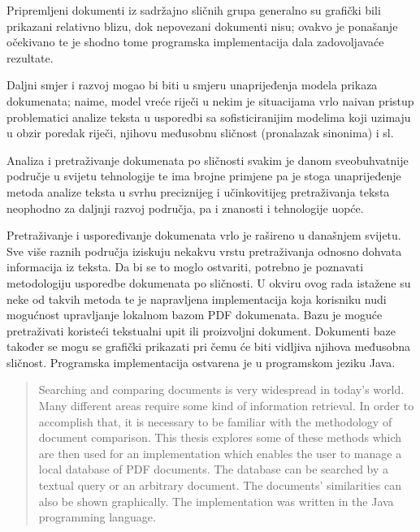 \documentclass[times, utf8, zavrsni, numeric]{fer}
\begin{document}
Pripremljeni dokumenti iz sadržajno sličnih grupa generalno su grafički bili prikazani relativno blizu, dok nepovezani dokumenti nisu; ovakvo je ponašanje očekivano te je shodno tome programska implementacija dala zadovoljavaće rezultate.

Daljni smjer i razvoj mogao bi biti u smjeru unaprijeđenja modela prikaza dokumenata; naime, model vreće riječi u nekim je situacijama vrlo naivan pristup problematici analize teksta u usporedbi sa sofisticiranijim modelima koji uzimaju u obzir poredak riječi, njihovu međusobnu sličnost (pronalazak sinonima) i sl.

Analiza i pretraživanje dokumenata po sličnosti svakim je danom sveobuhvatnije područje u svijetu tehnologije te ima brojne primjene pa je stoga unaprijeđenje metoda analize teksta u svrhu preciznijeg i učinkovitijeg pretraživanja teksta neophodno za daljnji razvoj područja, pa i znanosti i tehnologije uopće.




\begin{sazetak}
Pretraživanje i uspoređivanje dokumenata vrlo je rašireno u današnjem svijetu. Sve više raznih područja iziskuju nekakvu vrstu pretraživanja odnosno dohvata informacija iz teksta. Da bi se to moglo ostvariti, potrebno je poznavati metodologiju usporedbe dokumenata po sličnosti. U okviru ovog rada istažene su neke od takvih metoda te je napravljena implementacija koja korisniku nudi mogućnost upravljanje lokalnom bazom PDF dokumenata. Bazu je moguće pretraživati koristeći tekstualni upit ili proizvoljni dokument. Dokumenti baze također se mogu se grafički prikazati pri čemu će biti vidljiva njihova međusobna sličnost. Programska implementacija ostvarena je u programskom jeziku Java.

\end{sazetak}

\begin{abstract}
Searching and comparing documents is very widespread in today's world. Many different areas require some kind of information retrieval. In order to accomplish that, it is necessary to be familiar with the methodology of document comparison. This thesis explores some of these methods which are then used for an implementation which enables the user to manage a local database of PDF documents. The database can be searched by a textual query or an arbitrary document. The documents' similarities can also be shown graphically. The implementation was written in the Java programming language.

\end{abstract}
\end{document}
